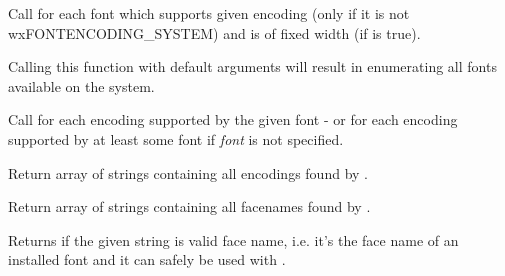 \label{wxfontenumeratorenumeratefacenames}


Call  for each font which
supports given encoding (only if it is not wxFONTENCODING\_SYSTEM) and is of
fixed width (if  is true).

Calling this function with default arguments will result in enumerating all
fonts available on the system.


\label{wxfontenumeratorenumerateencodings}


Call  for each
encoding supported by the given font - or for each encoding supported by at
least some font if {\it font} is not specified.


\label{wxfontenumeratorgetencodings}


Return array of strings containing all encodings found by 
.


\label{wxfontenumeratorgetfacenames}


Return array of strings containing all facenames found by 
.


\label{wxfontenumeratorisvalidfacename}


Returns \true if the given string is valid face name, i.e. it's the face name of an installed
font and it can safely be used with .


\label{wxfontenumeratoronfacename}

